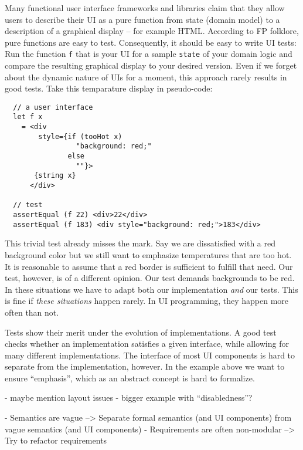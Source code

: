 \documentclass[sigplan,screen]{acmart}
\begin{document}
Many functional user interface frameworks and libraries claim that
they allow users to describe their UI as a pure function from state
(domain model) to a description of a graphical display -- for example
HTML. According to FP folklore, pure functions are easy to
test. Consequently, it should be easy to write UI tests: Run the
function \texttt{f} that is your UI for a sample \texttt{state} of
your domain logic and compare the resulting graphical display to your
desired version. Even if we forget about the dynamic nature of UIs for
a moment, this approach rarely results in good tests. Take this
temparature display in pseudo-code:
%
\begin{verbatim}
  // a user interface
  let f x
    = <div
        style={if (tooHot x)
                 "background: red;"
               else
                 ""}>
       {string x}
      </div>

  // test
  assertEqual (f 22) <div>22</div>
  assertEqual (f 183) <div style="background: red;">183</div>
\end{verbatim}
%
This trivial test already misses the mark. Say we are dissatisfied
with a red background color but we still want to emphasize
temperatures that are too hot. It is reasonable to assume that a red
border is sufficient to fulfill that need. Our test, however, is of a
different opinion. Our test demands backgrounds to be red. In these
situations we have to adapt both our implementation \textit{and} our
tests. This is fine if \textit{these situations} happen rarely. In UI
programming, they happen more often than not.

Tests show their merit under the evolution of implementations. A good
test checks whether an implementation satisfies a given interface,
while allowing for many different implementations. The interface of
most UI components is hard to separate from the implementation,
however. In the example above we want to ensure ``emphasis'', which as
an abstract concept is hard to formalize.

- maybe mention layout issues
- bigger example with ``disabledness''?

- Semantics are vague
--> Separate formal semantics (and UI components) from vague semantics (and UI components)
- Requirements are often non-modular
--> Try to refactor requirements



\end{document}

